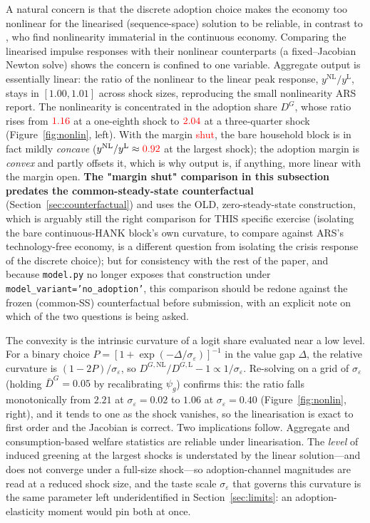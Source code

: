 \documentclass[11pt,a4paper]{article}
\newcommand{\NEEDSRERUN}[1]{\textcolor{red}{#1}}
\begin{document}
A natural concern is that the discrete adoption choice makes the economy too
nonlinear for the linearised (sequence-space) solution to be reliable, in
contrast to \citet{ARS2024}, who find nonlinearity immaterial in the continuous
economy. Comparing the linearised impulse responses with their nonlinear
counterparts (a fixed--Jacobian Newton solve) shows the concern is confined to
one variable. Aggregate output is essentially linear: the ratio of the
nonlinear to the linear peak response, $y^{\mathrm{NL}}/y^{\mathrm{L}}$, stays
in $[1.00,1.01]$ across shock sizes, reproducing the small nonlinearity ARS
report. The nonlinearity is concentrated in the adoption share $D^{G}$, whose
ratio rises from $\NEEDSRERUN{1.16}$ at a one-eighth shock to $\NEEDSRERUN{2.04}$ at a three-quarter
shock (Figure~\ref{fig:nonlin}, left). With the margin \NEEDSRERUN{shut}, the bare household
block is in fact mildly \emph{concave} ($y^{\mathrm{NL}}/y^{\mathrm{L}}\approx
\NEEDSRERUN{0.92}$ at the largest shock); the adoption margin is \emph{convex} and partly
offsets it, which is why output is, if anything, more linear with the margin
open. \textbf{The "margin shut" comparison in this subsection predates the
common-steady-state counterfactual} (Section~\ref{sec:counterfactual}) and uses
the OLD, zero-steady-state construction, which is arguably still the right
comparison for THIS specific exercise (isolating the bare continuous-HANK
block's own curvature, to compare against ARS's technology-free economy, is a
different question from isolating the crisis response of the discrete choice);
but for consistency with the rest of the paper, and because \texttt{model.py}
no longer exposes that construction under \texttt{model\_variant='no\_adoption'}, this comparison
should be redone against the frozen (common-SS) counterfactual before
submission, with an explicit note on which of the two questions is being asked.

The convexity is the intrinsic curvature of a logit share evaluated near a low
level. For a binary choice $P=[1+\exp(-\Delta/\sigma_\varepsilon)]^{-1}$ in the
value gap $\Delta$, the relative curvature is $(1-2P)/\sigma_\varepsilon$, so
$D^{G,\mathrm{NL}}/D^{G,\mathrm{L}}-1\propto 1/\sigma_\varepsilon$. Re-solving on
a grid of $\sigma_\varepsilon$ (holding $\bar D^{G}=0.05$ by recalibrating
$\psi_g$) confirms this: the ratio falls monotonically from $2.21$ at
$\sigma_\varepsilon=0.02$ to $1.06$ at $\sigma_\varepsilon=0.40$
(Figure~\ref{fig:nonlin}, right), and it tends to one as the shock vanishes, so
the linearisation is exact to first order and the Jacobian is correct. Two
implications follow. Aggregate and consumption-based welfare statistics are
reliable under linearisation. The \emph{level} of induced greening at the
largest shocks is understated by the linear solution---and does not converge
under a full-size shock---so adoption-channel magnitudes are read at a reduced
shock size, and the taste scale $\sigma_\varepsilon$ that governs this curvature
is the same parameter left underidentified in Section~\ref{sec:limits}: an
adoption-elasticity moment would pin both at once.
\end{document}
